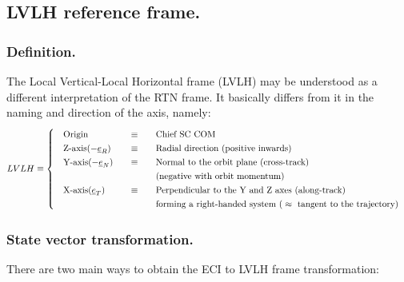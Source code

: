 	\subsection{LVLH reference frame.} \label{secAppB:LVLH}
		\subsubsection{Definition.}
		\indent The Local Vertical-Local Horizontal frame (LVLH) may be understood as a different interpretation of the RTN frame. It basically differs from it in the naming and direction of the axis, namely:
		\[
		\arraycolsep=10pt
		\def\arraystretch{1.3}
		LVLH\equiv\left\{
		\begin{array}{lll}
		\text{Origin} 	& \equiv 	& \text{Chief SC COM} \\
		\text{Z-axis}(-\underline{e}_R) 	& \equiv 	& \text{Radial direction (positive inwards)}\\
		\text{Y-axis}(-\underline{e}_N) 	& \equiv 	& \text{Normal to the orbit plane (cross-track) } \\
											& 			& \text{(negative with orbit momentum)}\\
		\text{X-axis}(\underline{e}_T) 	& \equiv 	& \text{Perpendicular to the Y and Z axes (along-track) } \\
									 	& 			& \text{forming a right-handed system (} \approx \text{ tangent to the trajectory)}
		\end{array}
		\right.
		\]
		\subsubsection{State vector transformation.}
		\indent There are two main ways to obtain the ECI to LVLH frame transformation:
